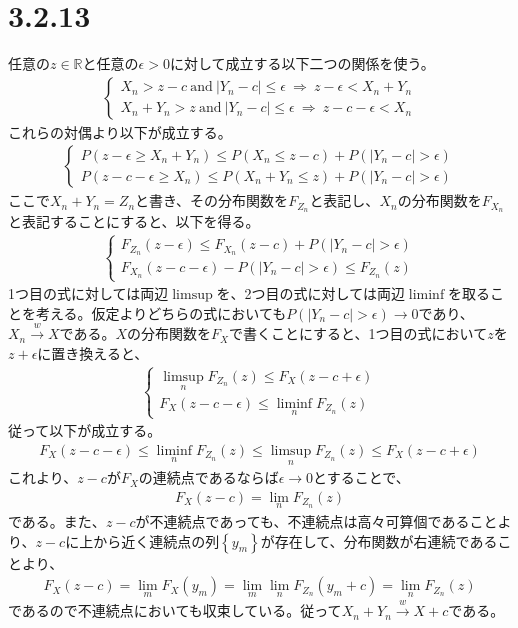 \documentclass{article}
\begin{document}
\section{3.2.13}
任意の$z \in \mathbb{R}$と任意の$\epsilon > 0$に対して成立する以下二つの関係を使う。
\begin{align*}
	\begin{cases}
	X_n > z-c\ \text{and}\ |Y_n - c| \leq \epsilon\ \Rightarrow\ z-\epsilon < X_n + Y_n\\
	X_n + Y_n > z\ \text{and}\ |Y_n - c| \leq \epsilon\ \Rightarrow\ z-c-\epsilon < X_n
	\end{cases}
\end{align*}
これらの対偶より以下が成立する。
\begin{align*}
	\begin{cases}
	P\left( z-\epsilon \geq X_n + Y_n \right) \leq P\left( X_n \leq z-c \right) + P\left( |Y_n - c| > \epsilon \right)\\[8pt]
	P\left( z-c-\epsilon \geq X_n \right) \leq P\left( X_n + Y_n \leq z \right) + P\left( |Y_n - c| > \epsilon \right)
	\end{cases}
\end{align*}
ここで$X_n + Y_n = Z_n$と書き、その分布関数を$F_{Z_n}$と表記し、$X_n$の分布関数を$F_{X_n}$と表記することにすると、以下を得る。
\begin{align*}
	\begin{cases}
	F_{Z_n}\left( z-\epsilon \right) \leq F_{X_n}\left( z-c \right) + P\left( |Y_n - c| > \epsilon \right)\\[8pt]
	F_{X_n}(z-c-\epsilon) - P\left( |Y_n - c| > \epsilon \right) \leq F_{Z_n}(z)
	\end{cases}
\end{align*}
1つ目の式に対しては両辺$\limsup$を、2つ目の式に対しては両辺$\liminf$を取ることを考える。仮定よりどちらの式においても$P\left( |Y_n - c| > \epsilon \right) \to 0$であり、$X_n \xrightarrow{w} X$である。$X$の分布関数を$F_X$で書くことにすると、1つ目の式において$z$を$z+\epsilon$に置き換えると、
\begin{align*}
	\begin{cases}
	\limsup_n F_{Z_n}(z) \leq F_X(z-c+\epsilon)\\
	F_X(z-c-\epsilon) \leq \liminf_n F_{Z_n}(z)
	\end{cases}
\end{align*}
従って以下が成立する。
\begin{align*}
	F_X(z-c-\epsilon) \leq \liminf_n F_{Z_n}(z) \leq \limsup_n F_{Z_n}(z) \leq F_X(z-c+\epsilon)
\end{align*}
これより、$z-c$が$F_X$の連続点であるならば$\epsilon \to 0$とすることで、
\begin{align*}
	F_X(z-c) = \lim_n F_{Z_n}(z)
\end{align*}
である。また、$z-c$が不連続点であっても、不連続点は高々可算個であることより、$z-c$に上から近く連続点の列$\left\{ y_m \right\}$が存在して、分布関数が右連続であることより、
\begin{align*}
	F_X(z-c) = \lim_m F_X(y_m) = \lim_m \lim_n F_{Z_n}(y_m + c) = \lim_n F_{Z_n}(z)
\end{align*}
であるので不連続点においても収束している。従って$X_n + Y_n \xrightarrow{w} X + c$である。
\end{document}
